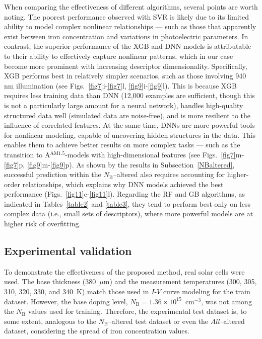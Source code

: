 \documentclass[a4paper,fleqn]{cas-sc}
\begin{document}
When comparing the effectiveness of different algorithms, several points are worth noting.
The poorest performance observed with SVR is likely due to its limited ability
to model complex nonlinear relationships ---
such as those that apparently exist between iron concentration and variations in photoelectric parameters.
In contrast, the superior performance of the XGB and DNN models is attributable to
their ability to effectively capture nonlinear patterns, which in our case become more prominent with increasing descriptor dimensionality.
Specifically, XGB performs best in relatively simpler scenarios, such as those involving 940 nm illumination
(see Figs.~\ref{fig7}i-\ref{fig7}l, \ref{fig9}i-\ref{fig9}l).
This is because XGB requires less training data than DNN
(12,000 examples are sufficient, though this is not a particularly large amount for a neural network),
handles high-quality structured data well (simulated data are noise-free),
and is more resilient to the influence of correlated features.
At the same time, DNNs are more powerful tools for nonlinear modeling,
capable of uncovering hidden structures in the data.
This enables them to achieve better results on more complex tasks ---
such as the transition to A$^\mathrm{AM1.5}$-models with high-dimensional features
(see Figs.~\ref{fig7}m-\ref{fig7}p, \ref{fig9}m-\ref{fig9}p).
As shown by the results in Subsection~\ref{NBaltered}, successful prediction within the
$N_\mathrm{B}$--altered also requires accounting for higher-order relationships,
which explains why DNN models achieved the best performance (Figs.~\ref{fig11}e-\ref{fig11}l).
Regarding the RF and GB algorithms, as indicated in Tables~\ref{table2} and \ref{table3},
they tend to perform best only on less complex data
(i.e., small sets of descriptors), where more powerful models are at higher risk of overfitting.



\subsection{Experimental validation}


To demonstrate the effectiveness of the proposed method, real solar cells were used.
The base thickness (380~$\mu$m) and the measurement temperatures (300, 305, 310, 320, 330, and 340~K) match those used in $I$-$V$ curve modeling for the train dataset.
However, the base doping level, $N_\mathrm{B}=1.36\times10^{15}$~cm$^{-3}$, was not among the $N_\mathrm{B}$ values used for training.
Therefore, the experimental test dataset is, to some extent, analogous to the $N_\mathrm{B}$--altered test dataset or even the $All$--altered dataset, considering the spread of iron concentration values.
\end{document}
